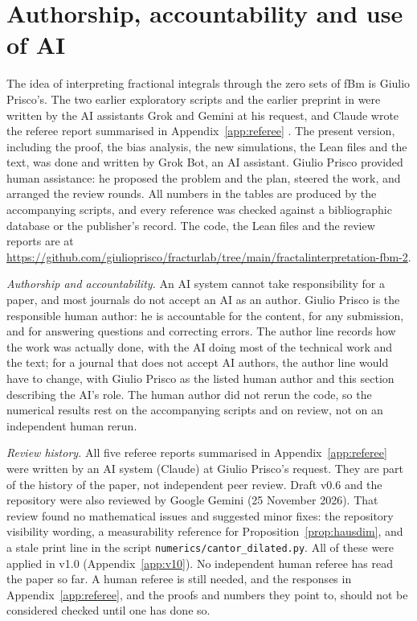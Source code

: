 \documentclass[11pt]{article}
\theoremstyle{remark}
\theoremstyle{definition}
\begin{document}
\section{Authorship, accountability and use of AI}\label{sec:methods}
The idea of interpreting fractional integrals through the zero sets of fBm is Giulio Prisco's. The two earlier exploratory scripts and the earlier preprint in \cite{fracturlab} were written by the AI assistants Grok and Gemini at his request, and Claude wrote the referee report summarised in Appendix~\ref{app:referee} \cite{Pri26}. The present version, including the proof, the bias analysis, the new simulations, the Lean files and the text, was done and written by Grok Bot, an AI assistant. Giulio Prisco provided human assistance: he proposed the problem and the plan, steered the work, and arranged the review rounds. All numbers in the tables are produced by the accompanying scripts, and every reference was checked against a bibliographic database or the publisher's record. The code, the Lean files and the review reports are at \url{https://github.com/giulioprisco/fracturlab/tree/main/fractalinterpretation-fbm-2}.

\emph{Authorship and accountability.} An AI system cannot take responsibility for a paper, and most journals do not accept an AI as an author. Giulio Prisco is the responsible human author: he is accountable for the content, for any submission, and for answering questions and correcting errors. The author line records how the work was actually done, with the AI doing most of the technical work and the text; for a journal that does not accept AI authors, the author line would have to change, with Giulio Prisco as the listed human author and this section describing the AI's role. The human author did not rerun the code, so the numerical results rest on the accompanying scripts and on review, not on an independent human rerun.

\emph{Review history.} All five referee reports summarised in Appendix~\ref{app:referee} were written by an AI system (Claude) at Giulio Prisco's request. They are part of the history of the paper, not independent peer review. Draft v0.6 and the repository were also reviewed by Google Gemini (25 November 2026). That review found no mathematical issues and suggested minor fixes: the repository visibility wording, a measurability reference for Proposition~\ref{prop:hausdim}, and a stale print line in the script \texttt{numerics/cantor\_dilated.py}. All of these were applied in v1.0 (Appendix~\ref{app:v10}). No independent human referee has read the paper so far. A human referee is still needed, and the responses in Appendix~\ref{app:referee}, and the proofs and numbers they point to, should not be considered checked until one has done so.
\end{document}

